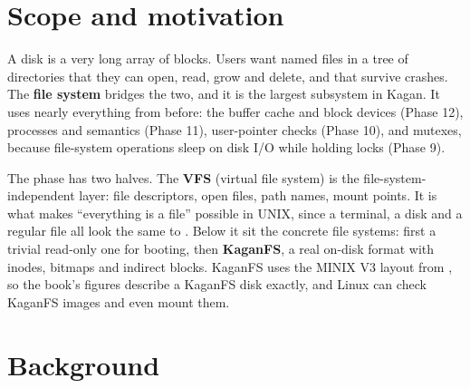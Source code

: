 \documentclass[11pt,a4paper]{article}
\begin{document}


\section{Scope and motivation}

A disk is a very long array of blocks. Users want named files in a tree of directories that they can open, read,
grow and delete, and that survive crashes. The \textbf{file system} bridges the two, and it is the largest subsystem
in Kagan. It uses nearly everything from before: the buffer cache and block devices (Phase 12), processes and
 semantics (Phase 11), user-pointer checks (Phase 10), and mutexes, because file-system operations sleep on
disk I/O while holding locks (Phase 9).

The phase has two halves. The \textbf{VFS} (virtual file system) is the file-system-independent layer: file
descriptors, open files, path names, mount points. It is what makes ``everything is a file'' possible in UNIX, since
a terminal, a disk and a regular file all look the same to . Below it sit the concrete file systems:
first a trivial read-only one for booting, then \textbf{KaganFS}, a real on-disk format with inodes, bitmaps and
indirect blocks. KaganFS uses the MINIX V3 layout from \OSDI, so the book's figures describe a KaganFS disk exactly, and
Linux can check KaganFS images and even mount them.

\section{Background}
\end{document}
